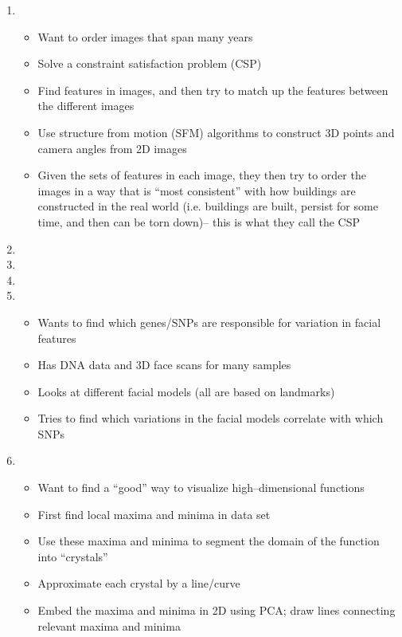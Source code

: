 \documentclass[12pt]{article}
\begin{document}
\begin{enumerate}
\item {}
\begin{itemize}
	\item Want to order images that span many years
	\item Solve a constraint satisfaction problem (CSP)
	\item Find features in images, and then try to match up the features between the different images
	\item Use structure from motion (SFM) algorithms to construct 3D points and camera angles from 2D images
	\item Given the sets of features in each image, they then try to order the images in a way that is ``most consistent'' with how buildings are constructed in the real world (i.e. buildings are built, persist for some time, and then can be torn down)-- this is what they call the CSP
\end{itemize}
\item {}

\item {}

\item {}

\item {}
\begin{itemize}
	\item Wants to find which genes/SNPs are responsible for variation in facial features
	\item Has DNA data and 3D face scans for many samples
	\item Looks at different facial models (all are based on landmarks)
	\item Tries to find which variations in the facial models correlate with which SNPs
\end{itemize}

\item {}
\begin{itemize}
	\item Want to find a ``good'' way to visualize high--dimensional functions
	\item First find local maxima and minima in data set
	\item Use these maxima and minima to segment the domain of the function into ``crystals''
	\item Approximate each crystal by a line/curve
	\item Embed the maxima and minima in 2D using PCA; draw lines connecting relevant maxima and minima
\end{itemize}


\end{enumerate}
\end{document}
